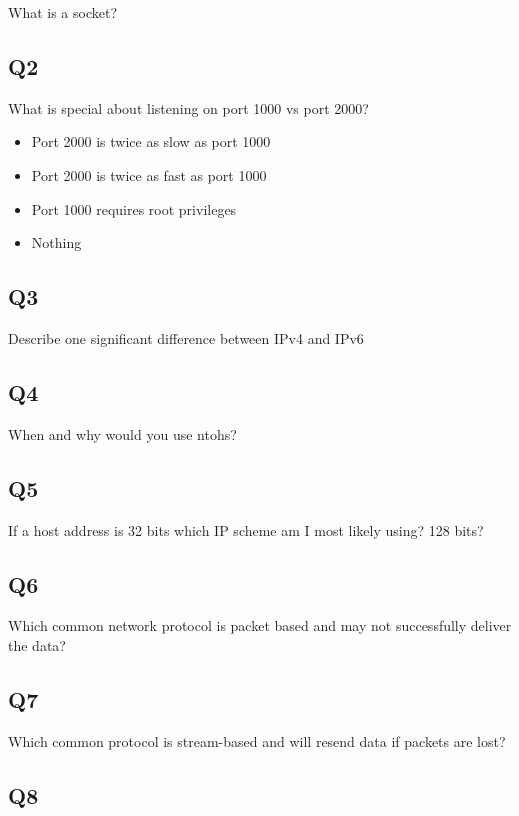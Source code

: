 What is a socket?

\subsection{Q2}\label{q2-5}

What is special about listening on port 1000 vs port 2000?

\begin{itemize}
\tightlist
\item
  Port 2000 is twice as slow as port 1000
\item
  Port 2000 is twice as fast as port 1000
\item
  Port 1000 requires root privileges
\item
  Nothing
\end{itemize}

\subsection{Q3}\label{q3-4}

Describe one significant difference between IPv4 and IPv6

\subsection{Q4}\label{q4-4}

When and why would you use ntohs?

\subsection{Q5}\label{q5-3}

If a host address is 32 bits which IP scheme am I most likely using? 128
bits?

\subsection{Q6}\label{q6-1}

Which common network protocol is packet based and may not successfully
deliver the data?

\subsection{Q7}\label{q7-1}

Which common protocol is stream-based and will resend data if packets
are lost?

\subsection{Q8}\label{q8}

